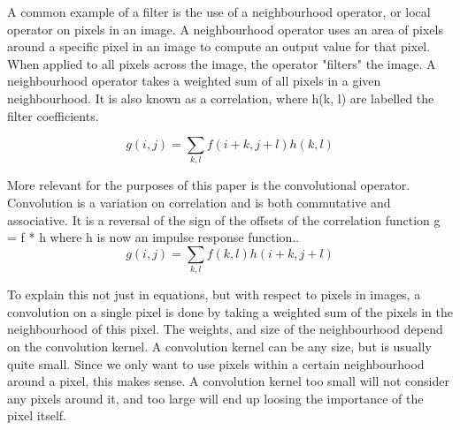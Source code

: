 \documentclass[12pt]{report} %
\begin{document}
	A common example of a filter is the use of a neighbourhood operator, or local operator on pixels in an image. A neighbourhood operator uses an area of pixels around a specific pixel in an image to compute an output value for that pixel. When applied to all pixels across the image, the operator "filters" the image. A neighbourhood operator takes a weighted sum of all pixels in a given neighbourhood. It is also known as a correlation, where h(k, l) are labelled the filter coefficients.\cite{szeliski2010computer} 
	
\begin{equation}
g(i,j) = \sum_{k,l} f(i+k,j+l)h(k,l)
\end{equation}
	
	More relevant for the purposes of this paper is the convolutional operator. Convolution is a variation on correlation and is both commutative and associative. It is a reversal of the sign of the offsets of the correlation function  g = f * h where h is now an impulse response function.\cite{szeliski2010computer}. 
\begin{equation}
g(i,j) = \sum_{k,l} f(k, l)h(i + k, j + l)
\end{equation}

	To explain this not just in equations, but with respect to pixels in images, a convolution on a single pixel is done by taking a weighted sum of the pixels in the neighbourhood of this pixel. The weights, and size of the neighbourhood depend on the convolution kernel\cite{RiverTrail}. A convolution kernel can be any size, but is usually quite small. Since we only want to use pixels within a certain neighbourhood around a pixel, this makes sense. A convolution kernel too small will not consider any pixels around it, and too large will end up loosing the importance of the pixel itself. 
	
\end{document}
